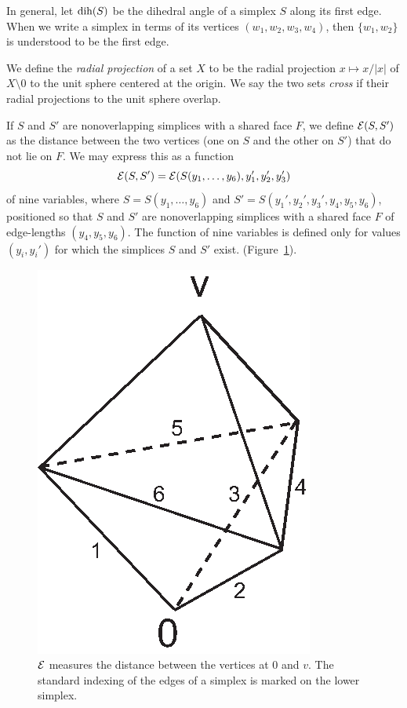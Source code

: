 \begin{definition}\label{def:dih}
In general, let $\operatorname{dih}(S)$ be the dihedral angle of a simplex $S$
along its first edge. When we write a simplex in terms of its
vertices $(w_1,w_2,w_3,w_4)$, then $\{w_1,w_2\}$ is understood to
be the first edge.
%
\end{definition}

\begin{definition}
We define the {\it radial projection\/} of a set $X$ to be the
radial projection $x\mapsto x/|x|$ of $X\setminus{0}$ to the unit
sphere centered at the origin. We say the two sets {\it cross\/}
if their radial projections to the unit sphere
overlap.
%
\end{definition}


\begin{definition}
    \label{def:calE}
If $S$ and $S'$ are nonoverlapping simplices with a shared face $F$,
we define ${\mathcal E}(S,S')$ as the distance between the two vertices
(one on $S$ and the other on $S'$) that do not lie on $F$.  We may
express this as a function
   $${\mathcal E}(S,S')={\mathcal E}(S(y_1,\ldots,y_6),y_1',y_2',y_3')$$
of nine variables, where $S=S(y_1,\ldots,y_6)$  and
$S'=S(y_1',y_2',y_3',y_4,y_5,y_6)$, positioned so that $S$ and $S'$
are nonoverlapping simplices with a shared face $F$ of edge-lengths
$(y_4,y_5,y_6)$.   The function of nine variables is defined only
for values $(y_i,y_i')$ for which the simplices $S$ and $S'$ exist.
(Figure~\ref{fig:diag11}).
\end{definition}

\begin{figure}[htb]
  \centering
  \includegraphics{PS/calE.eps}
  \caption{${\mathcal E}$ measures the distance between the vertices at $0$ and $v$.
   The standard indexing of the edges of a simplex
   is marked on the lower simplex.}
  \label{fig:diag11}
\end{figure}

